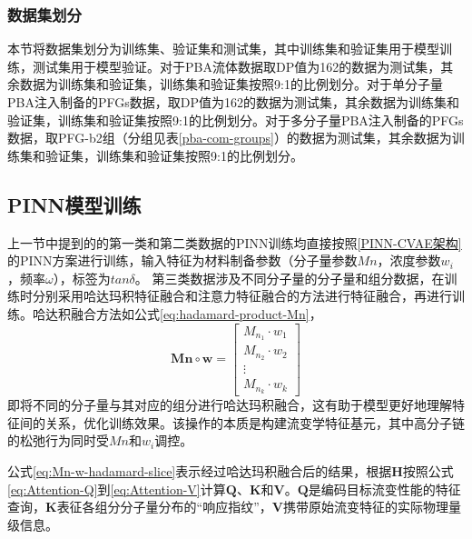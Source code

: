 \subsubsection{数据集划分}
本节将数据集划分为训练集、验证集和测试集，其中训练集和验证集用于模型训练，测试集用于模型验证。对于PBA流体数据取DP值为162的数据为测试集，其余数据为训练集和验证集，训练集和验证集按照9:1的比例划分。对于单分子量PBA注入制备的PFGs数据，取DP值为162的数据为测试集，其余数据为训练集和验证集，训练集和验证集按照9:1的比例划分。对于多分子量PBA注入制备的PFGs数据，取PFG-b2组（分组见表\ref{pba-com-groups}）的数据为测试集，其余数据为训练集和验证集，训练集和验证集按照9:1的比例划分。

\subsection{PINN模型训练}
上一节中提到的的第一类和第二类数据的PINN训练均直接按照\ref{PINN-CVAE架构}的PINN方案进行训练，输入特征为材料制备参数（分子量参数$Mn$，浓度参数$w_i$，频率$\omega$），标签为$tan\delta$。
第三类数据涉及不同分子量的分子量和组分数据，在训练时分别采用哈达玛积特征融合和注意力特征融合的方法进行特征融合，再进行训练。哈达积融合方法如公式\eqref{eq:hadamard-product-Mn}，
\begin{equation}
  \mathbf{Mn} \circ \mathbf{w} =
  \begin{bmatrix}
    M_{n_1} \cdot w_1 \\
    M_{n_2} \cdot w_2 \\
    \vdots            \\
    M_{n_k} \cdot w_k
  \end{bmatrix} \label{eq:hadamard-product-Mn}
\end{equation}
即将不同的分子量与其对应的组分进行哈达玛积融合，这有助于模型更好地理解特征间的关系，优化训练效果。该操作的本质是构建流变学特征基元，其中高分子链的松弛行为同时受$Mn$和$w_i$调控。

公式\eqref{eq:Mn-w-hadamard-slice}表示经过哈达玛积融合后的结果，根据$\mathbf{H}$按照公式\eqref{eq:Attention-Q}到\eqref{eq:Attention-V}计算$\mathbf{Q}$、$\mathbf{K}$和$\mathbf{V}$。$\mathbf{Q}$是编码目标流变性能的特征查询，$\mathbf{K}$表征各组分分子量分布的“响应指纹”，$\mathbf{V}$携带原始流变特征的实际物理量级信息。

